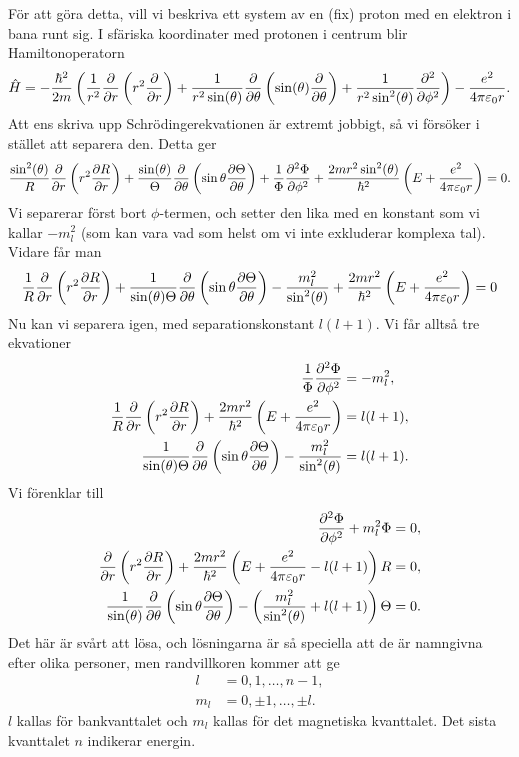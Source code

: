 För att göra detta, vill vi beskriva ett system av en (fix) proton med en elektron i bana runt sig. I sfäriska koordinater med protonen i centrum blir Hamiltonoperatorn
\begin{align*}
	\hat{H} = -\frac{\hbar^{2}}{2m}\left(\frac{1}{r^{2}}\pdv{r}\left(r^{2}\pdv{r}\right) + \frac{1}{r^{2}\sin(\theta)}\pdv{\theta}\left(\sin(\theta)\pdv{\theta}\right) + \frac{1}{r^{2}\sin^{2}(\theta)}\pdv[2]{\phi}\right) - \frac{e^{2}}{4\pi\varepsilon_{0}r}.
\end{align*}
Att ens skriva upp Schrödingerekvationen är extremt jobbigt, så vi försöker i stället att separera den. Detta ger
\begin{align*}
	\frac{\sin^{2}(\theta)}{R}\pdv{r}\left(r^{2}\pdv{R}{r}\right) + \frac{\sin(\theta)}{\Theta}\pdv{\theta}\left(\sin{\theta}\pdv{\Theta}{\theta}\right) + \frac{1}{\Phi}\pdv[2]{\Phi}{\phi} + \frac{2mr^{2}\sin^{2}(\theta)}{\hbar^{2}}\left(E + \frac{e^{2}}{4\pi\varepsilon_{0}r}\right) = 0.
\end{align*}
Vi separerar först bort $\phi$-termen, och setter den lika med en konstant som vi kallar $-m_{l}^{2}$ (som kan vara vad som helst om vi inte exkluderar komplexa tal). Vidare får man
\begin{align*}
	\frac{1}{R}\pdv{r}\left(r^{2}\pdv{R}{r}\right) + \frac{1}{\sin(\theta)\Theta}\pdv{\theta}\left(\sin{\theta}\pdv{\Theta}{\theta}\right) - \frac{m_{l}^{2}}{\sin^{2}(\theta)} + \frac{2mr^{2}}{\hbar^{2}}\left(E + \frac{e^{2}}{4\pi\varepsilon_{0}r}\right) = 0
\end{align*}
Nu kan vi separera igen, med separationskonstant $l(l + 1)$. Vi får alltså tre ekvationer
\begin{align*}
	\frac{1}{\Phi}\pdv[2]{\Phi}{\phi}     &= -m_{l}^{2}, \\
	\frac{1}{R}\pdv{r}\left(r^{2}\pdv{R}{r}\right) + \frac{2mr^{2}}{\hbar^{2}}\left(E + \frac{e^{2}}{4\pi\varepsilon_{0}r}\right) &= l(l + 1), \\
	\frac{1}{\sin(\theta)\Theta}\pdv{\theta}\left(\sin{\theta}\pdv{\Theta}{\theta}\right) - \frac{m_{l}^{2}}{\sin^{2}(\theta)}      &= l(l + 1).
\end{align*}
Vi förenklar till
\begin{align*}
	\pdv[2]{\Phi}{\phi} + m_{l}^{2}\Phi                          &= 0, \\
	\pdv{r}\left(r^{2}\pdv{R}{r}\right) + \frac{2mr^{2}}{\hbar^{2}}\left(E + \frac{e^{2}}{4\pi\varepsilon_{0}r} - l(l + 1)\right)R                        &= 0, \\
	\frac{1}{\sin(\theta)}\pdv{\theta}\left(\sin{\theta}\pdv{\Theta}{\theta}\right) - \left(\frac{m_{l}^{2}}{\sin^{2}(\theta)} + l(l + 1)\right)\Theta &= 0.
\end{align*}
Det här är svårt att lösa, och lösningarna är så speciella att de är namngivna efter olika personer, men randvillkoren kommer att ge
\begin{align*}
	l     &= 0, 1, \dots, n - 1, \\
	m_{l} &= 0, \pm 1, \dots, \pm l.
\end{align*}
$l$ kallas för bankvanttalet och $m_{l}$ kallas för det magnetiska kvanttalet. Det sista kvanttalet $n$ indikerar energin.

